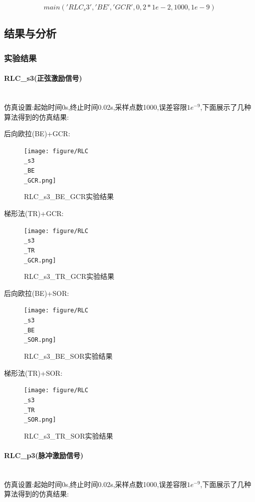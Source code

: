 \documentclass[12pt]{article}
\newcommand{\subsubsubsection}[1]{\paragraph{#1}\mbox{}\\}
\begin{document}
\begin{sloppypar}
\begin{equation}
  main('RLC_s3','BE','GCR',0 ,2*1e-2,1000,1e-9)
\end{equation}

\subsection{结果与分析}
\subsubsection{实验结果}
\subsubsubsection{RLC\_s3(正弦激励信号)}
\qquad 仿真设置:起始时间0s,终止时间0.02s,采样点数1000,误差容限$1e^{-9}$,下面展示了几种算法得到的仿真结果:

后向欧拉(BE)+GCR:

\begin{figure}[H]
  \centering
  \texttt{[image: figure/RLC\\\_s3\\\_BE\\\_GCR.png]}
  \caption{RLC\_s3\_BE\_GCR实验结果}
\end{figure}

梯形法(TR)+GCR:

\begin{figure}[H]
  \centering
  \texttt{[image: figure/RLC\\\_s3\\\_TR\\\_GCR.png]}
  \caption{RLC\_s3\_TR\_GCR实验结果}
\end{figure}

后向欧拉(BE)+SOR:

\begin{figure}[H]
  \centering
  \texttt{[image: figure/RLC\\\_s3\\\_BE\\\_SOR.png]}
  \caption{RLC\_s3\_BE\_SOR实验结果}
\end{figure}

梯形法(TR)+SOR:

\begin{figure}[H]
  \centering
  \texttt{[image: figure/RLC\\\_s3\\\_TR\\\_SOR.png]}
  \caption{RLC\_s3\_TR\_SOR实验结果}
\end{figure}

\subsubsubsection{RLC\_p3(脉冲激励信号)}
\qquad 仿真设置:起始时间0s,终止时间0.02s,采样点数1000,误差容限$1e^{-9}$,下面展示了几种算法得到的仿真结果:


\end{sloppypar}
\end{document}
